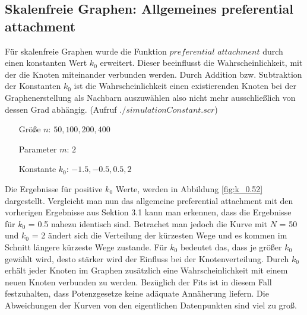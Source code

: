 \documentclass[10pt]{article}
\begin{document}
\subsection{Skalenfreie Graphen: Allgemeines preferential attachment}
Für skalenfreie Graphen wurde die Funktion $preferential$ $attachment$ durch einen konstanten Wert $k_0$ erweitert. Dieser beeinflusst die Wahrscheinlichkeit, mit der die Knoten miteinander verbunden werden. Durch Addition bzw. Subtraktion der Konstanten $k_0$ ist die Wahrscheinlichkeit einen existierenden Knoten bei der Graphenerstellung als Nachbarn auszuwählen also nicht mehr ausschließlich von dessen Grad abhängig. (Aufruf $./simulationConstant.scr$) 

\begin{itemize}
\item[\quad Größe $n$:] $50,100,200,400$
\item[\quad Parameter $m$:] $2$
\item[\quad Konstante $k_0$:] $-1.5,-0.5,0.5,2$
\end{itemize}

Die Ergebnisse für positive $k_0$ Werte, werden in Abbildung \ref{fig:k_0.52} dargestellt. Vergleicht man nun das allgemeine preferential attachment mit den vorherigen Ergebnisse aus Sektion 3.1 kann man erkennen, dass die Ergebnisse für $k_0$ = 0.5 nahezu identisch sind. Betrachet man jedoch die Kurve mit $N$ = 50 und $k_0$ = 2 ändert sich die Verteilung der kürzesten Wege und es kommen im Schnitt längere kürzeste Wege zustande. Für $k_0$ bedeutet das, dass je größer $k_0$ gewählt wird, desto stärker wird der Einfluss bei der Knotenverteilung. Durch $k_0$ erhält jeder Knoten im Graphen zusätzlich eine Wahrscheinlichkeit mit einem neuen Knoten verbunden zu werden. Bezüglich der Fits ist in diesem Fall festzuhalten, dass Potenzgesetze keine adäquate Annäherung liefern. Die Abweichungen der Kurven von den eigentlichen Datenpunkten sind viel zu groß.
\end{document}

